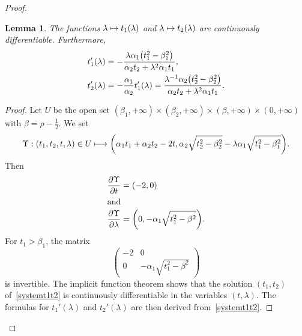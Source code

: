 \documentclass[10pt]{amsart}
\newtheorem{lemm}[theo]{Lemma}\newtheorem{prop}[theo]{Proposition}\newtheorem{coro}[theo]{Corollary}\newtheorem{conj}[theo]{Conjecture}
\theoremstyle{definition}\newtheorem{defi}[theo]{Definition}\newtheorem{rema}[theo]{Remark}\newtheorem{exam}[theo]{Example}\newtheorem{exem}[theo]{Example}\newtheorem{nota}[theo]{Notation}
\let\originalleft\left
\let\originalright\right
\renewcommand{\left}{\mathopen{}\mathclose\bgroup\originalleft}
\renewcommand{\right}{\aftergroup\egroup\originalright}
\let\oldin\in
\renewcommand{\in}{\mathchoice{\oldin}{\oldin}{\,\oldin\,}{\,\oldin\,}}
\let\oldmapsto\mapsto
\renewcommand*{\mapsto}{\mathchoice{\longmapsto}{\oldmapsto}{\oldmapsto}{\oldmapsto}}
\begin{document}
\begin{proof}
\begin{lemm}\label{t1t2deriviative}
The functions $\lambda \mapsto t_1(\lambda)$ and $\lambda \mapsto t_2(\lambda)$ are continuously differentiable. Furthermore,
\begin{align*}
t_1'(\lambda) &= - \frac{\lambda \alpha_1\left(t_1^2 - \beta_1^2\right)}{\alpha_2 t_2 + \lambda^2 \alpha_1 t_1}, \\
t_2'(\lambda) &= - \frac{\alpha_1}{\alpha_2} t_1'(\lambda) = \frac{\lambda^{-1} \alpha_2 \left(t_2^2 - \beta_2^2 \right)}{\alpha_2 t_2 + \lambda^2 \alpha_1 t_1}.
\end{align*}
\end{lemm}

\begin{proof}
Let $U$ be the open set $(\beta_1,+\infty)\times (\beta_2,+\infty)\times (\beta,+\infty)\times (0,+\infty)$ with $\beta = \rho - \frac{1}{2}$. We set
\[
\Upsilon:(t_1,t_2,t,\lambda)\in U\mapsto \left(\alpha_1 t_1 + \alpha_2 t_2-2t, \alpha_2 \sqrt{t_2^2 - \beta_2^2}- \lambda \alpha_1 \sqrt{t_1^2 - \beta_1^2}\right).
\]
Then
\begin{align*}
\frac{\partial \Upsilon}{\partial t}&=(-2,0)
\\
\intertext{and}
\frac{\partial \Upsilon}{\partial \lambda}&=\left(0,- \alpha_1 \sqrt{t_1^2-\beta^2}\right).
\end{align*}
For $t_1>\beta_1$, the matrix
\[
\begin{pmatrix}
-2&0\\
0&- \alpha_1 \sqrt{t_1^2-\beta^2}
\end{pmatrix}
\]
is invertible. The implicit function theorem shows that the solution $(t_1,t_2)$ of~\eqref{systemt1t2} is continuously differentiable in the variables $(t,\lambda)$. The formulas for $t_1'(\lambda)$ and $t_2'(\lambda)$ are then derived from~\eqref{systemt1t2}.
\end{proof}


\end{proof}
\end{document}

